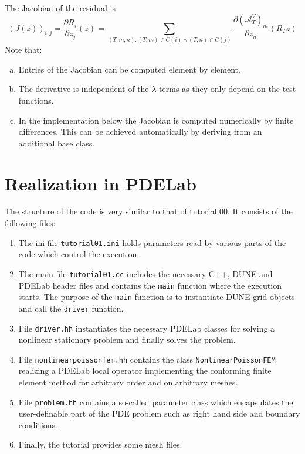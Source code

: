 \documentclass[a4paper,12pt]{article}
\begin{document}
The Jacobian of the residual is
\begin{equation*}
(J(z))_{i,j} = \frac{\partial R_i}{\partial z_j} (z) =
\sum_{(T,m,n) : (T,m)\in C(i) \wedge (T,n)\in C(j)} \frac{\partial (\mathcal{A}_T^V)_m}{\partial z_n}
(R_T z)
\end{equation*}
Note that:
\begin{enumerate}[a)]
\item Entries of the Jacobian can be computed element by element.
\item The derivative is independent of the $\lambda$-terms as
they only depend on the test functions.
\item In the implementation below the Jacobian is computed numerically
by finite differences. This can be achieved automatically by deriving from an
additional base class.
\end{enumerate}

\section{Realization in PDELab}

The structure of the code is very similar to that of tutorial 00. It consists of the following
files:
\begin{enumerate}[1)]
\item The ini-file
\lstinline{tutorial01.ini} holds parameters read by various parts of the code
which control the execution.
\item The main file \lstinline{tutorial01.cc} includes the necessary C++,
DUNE and PDELab header files
and contains the \lstinline{main} function where the execution starts.
The purpose of the \lstinline{main} function is
to instantiate DUNE grid objects and call the \lstinline{driver} function.
\item File \lstinline{driver.hh} instantiates the necessary PDELab classes
for solving a nonlinear stationary problem and finally solves the problem.
\item File \lstinline{nonlinearpoissonfem.hh} contains the class
\lstinline{NonlinearPoissonFEM} realizing a PDELab local operator implementing
the conforming finite element method for arbitrary order and on arbitrary meshes.
\item File \lstinline{problem.hh} contains a so-called parameter class which
encapsulates the user-definable part of the PDE problem such as right hand
side and boundary conditions.
\item Finally, the tutorial provides some mesh files.
\end{enumerate}
\end{document}
